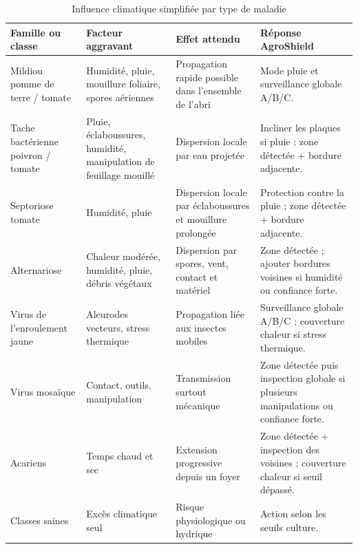 ﻿\documentclass[11pt,a4paper,openany]{report}
\begin{document}
\begin{table}[H]
\centering
\small
\renewcommand{\arraystretch}{1.35}

\begin{tabular}{|p{3cm}|p{3.2cm}|p{3.4cm}|p{4.2cm}|}
\hline
\textbf{Famille ou classe} &
\textbf{Facteur aggravant} &
\textbf{Effet attendu} &
\textbf{Réponse AgroShield} \\
\hline

Mildiou pomme de terre / tomate &
Humidité, pluie, mouillure foliaire, spores aériennes &
Propagation rapide possible dans l'ensemble de l'abri &
Mode pluie et surveillance globale A/B/C. \\
\hline

Tache bactérienne poivron / tomate &
Pluie, éclaboussures, humidité, manipulation de feuillage mouillé &
Dispersion locale par eau projetée &
Incliner les plaques si pluie ; zone détectée + bordure adjacente. \\
\hline

Septoriose tomate &
Humidité, pluie &
Dispersion locale par éclaboussures et mouillure prolongée &
Protection contre la pluie ; zone détectée + bordure adjacente. \\
\hline

Alternariose &
Chaleur modérée, humidité, pluie, débris végétaux &
Dispersion par spores, vent, contact et matériel &
Zone détectée ; ajouter bordures voisines si humidité ou confiance forte. \\
\hline

Virus de l'enroulement jaune &
Aleurodes vecteurs, stress thermique &
Propagation liée aux insectes mobiles &
Surveillance globale A/B/C ; couverture chaleur si stress thermique. \\
\hline

Virus mosaïque &
Contact, outils, manipulation &
Transmission surtout mécanique &
Zone détectée puis inspection globale si plusieurs manipulations ou confiance forte. \\
\hline

Acariens &
Temps chaud et sec &
Extension progressive depuis un foyer &
Zone détectée + inspection des voisines ; couverture chaleur si seuil dépassé. \\
\hline

Classes saines &
Excès climatique seul &
Risque physiologique ou hydrique &
Action selon les seuils culture. \\
\hline

\end{tabular}

\caption{Influence climatique simplifiée par type de maladie}
\label{tab:maladie_climat}
\end{table}
\end{document}
